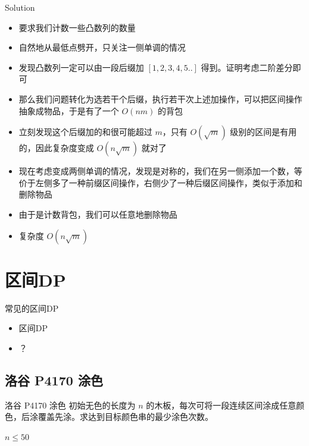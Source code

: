 ﻿\documentclass[aspectratio=169]{ctexbeamer}
\begin{document}
\begin{frame}{Solution}
    \begin{itemize}
        \item 要求我们计数一些凸数列的数量
        \item 自然地从最低点劈开，只关注一侧单调的情况
        \item 发现凸数列一定可以由一段后缀加 $[1,2,3,4,5..]$ 得到。证明考虑二阶差分即可
        \item 那么我们问题转化为选若干个后缀，执行若干次上述加操作，可以把区间操作抽象成物品，于是有了一个 $O(nm)$ 的背包
        \item 立刻发现这个后缀加的和很可能超过 $m$，只有 $O(\sqrt{m})$ 级别的区间是有用的，因此复杂度变成 $O(n\sqrt{m})$ 就对了
        \item 现在考虑变成两侧单调的情况，发现是对称的，我们在另一侧添加一个数，等价于左侧多了一种前缀区间操作，右侧少了一种后缀区间操作，类似于添加和删除物品
        \item 由于是计数背包，我们可以任意地删除物品
        \item 复杂度 $O(n\sqrt{m})$
    \end{itemize}
\end{frame}
















\section{区间DP}

\begin{frame}{常见的区间DP}
    \begin{itemize}
        \item 区间DP
        \item ？
    \end{itemize}
\end{frame}

\subsection{洛谷 P4170 涂色}
\begin{frame}{洛谷 P4170 涂色}
    初始无色的长度为 $n$ 的木板，每次可将一段连续区间涂成任意颜色，后涂覆盖先涂。求达到目标颜色串的最少涂色次数。
    
    $n\le 50$
\end{frame}
\end{document}
